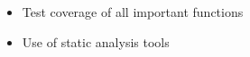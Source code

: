 
\begin{itemize}
    \item Test coverage of all important functions
    \item Use of static analysis tools
\end{itemize} 

